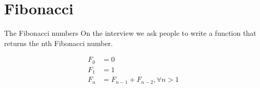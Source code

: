 \documentclass[presentation,aspectratio=169,smaller]{beamer}
\begin{document}
\section*{Fibonacci}
\label{sec:org97bf7fc}

\begin{frame}[label={sec:org9e25a74}]{The Fibonacci numbers}
On the interview we ask people to write a function that returns the nth
Fibonacci number.

\begin{align*}
  F_0 &= 0 \\
  F_1 &= 1 \\
  F_n &= F_{n - 1} + F_{n - 2}, \forall n > 1 \\
\end{align*}
\end{frame}
\end{document}
